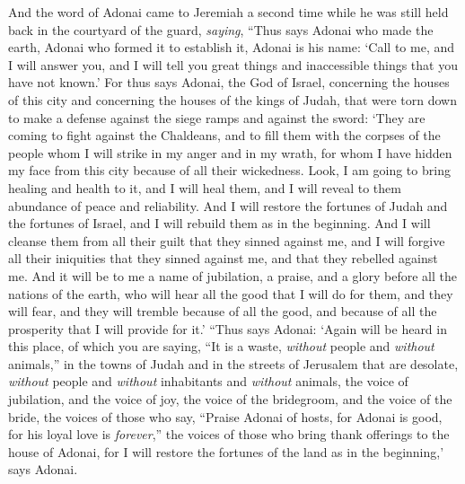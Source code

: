 \begin{biblechapter} %
 And the word of Adonai came to Jeremiah a second time while he was still held back in the courtyard of the guard, \textit{saying},
\verse “Thus says Adonai who made the earth, Adonai who formed it to establish it, Adonai is his name:
\verse ‘Call to me, and I will answer you, and I will tell you great things and inaccessible things that you have not known.’
\verse For thus says Adonai, the God of Israel, concerning the houses of this city and concerning the houses of the kings of Judah, that were torn down to make a defense against the siege ramps and against the sword:
\verse ‘They are coming to fight against the Chaldeans, and to fill them with the corpses of the people whom I will strike in my anger and in my wrath, for whom I have hidden my face from this city because of all their wickedness.
\verse Look, I am going to bring healing and health to it, and I will heal them, and I will reveal to them abundance of peace and reliability.
\verse And I will restore the fortunes of Judah and the fortunes of Israel, and I will rebuild them as in the beginning.
\verse And I will cleanse them from all their guilt that they sinned against me, and I will forgive all their iniquities that they sinned against me, and that they rebelled against me.
\verse And it will be to me a name of jubilation, a praise, and a glory before all the nations of the earth, who will hear all the good that I will do for them, and they will fear, and they will tremble because of all the good, and because of all the prosperity that I will provide for it.’
\verse “Thus says Adonai: ‘Again will be heard in this place, of which you are saying, “It is a waste, \textit{without} people and \textit{without} animals,” in the towns of Judah and in the streets of Jerusalem that are desolate, \textit{without} people and \textit{without} inhabitants and \textit{without} animals,
\verse the voice of jubilation, and the voice of joy, the voice of the bridegroom, and the voice of the bride, the voices of those who say, “Praise Adonai of hosts, for Adonai is good, for his loyal love is \textit{forever},” the voices of those who bring thank offerings to the house of Adonai, for I will restore the fortunes of the land as in the beginning,’ says Adonai.

\end{biblechapter}
